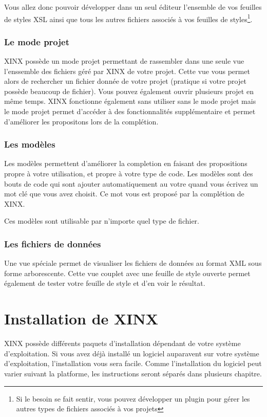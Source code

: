 \documentclass[a4paper,10pt,twoside]{book}
\begin{document}
Vous allez donc pouvoir développer dans un seul éditeur l'ensemble de vos feuilles de styles XSL ainsi que tous les autres fichiers associés à vos feuilles de styles\footnote{Si le besoin se fait sentir, vous pouvez développer un plugin pour gérer les autres types de fichiers associés à vos projets}.

\subsection{Le mode projet}

XINX possède un mode projet permettant de rassembler dans une seule vue l'enssemble des fichiers géré par XINX de votre projet. Cette vue vous permet alors de rechercher un fichier donnée de votre projet (pratique si votre projet possède beaucoup de fichier). Vous pouvez également ouvrir plusieurs projet en même temps. XINX fonctionne également sans utiliser sans le mode projet mais le mode projet permet d'accéder à des fonctionnalités supplémentaire et permet d'améliorer les propositons lors de la complétion.

\subsection{Les modèles}

Les modèles permettent d'améliorer la completion en faisant des propositions propre à votre utilisation, et propre à votre type de code. Les modèles sont des bouts de code qui sont ajouter automatiquement au votre quand vous écrivez un mot clé que vous avez choisit. Ce mot vous est proposé par la complétion de XINX.

Ces modèles sont utilisable par n'importe quel type de fichier.

\subsection{Les fichiers de données}

Une vue spéciale permet de visualiser les fichiers de données au format XML sous forme arborescente. Cette vue couplet avec une feuille de style ouverte permet également de tester votre feuille de style et d'en voir le résultat.

\chapter{Installation de XINX}

XINX possède différents paquets d'installation dépendant de votre système d'exploitation. Si vous avez déjà installé un logiciel auparavent sur votre système d'exploitation, l'installation vous sera facile. Comme l'installation du logiciel peut varier suivant la platforme, les instructions seront séparés dans plusieurs chapitre.
\end{document}
